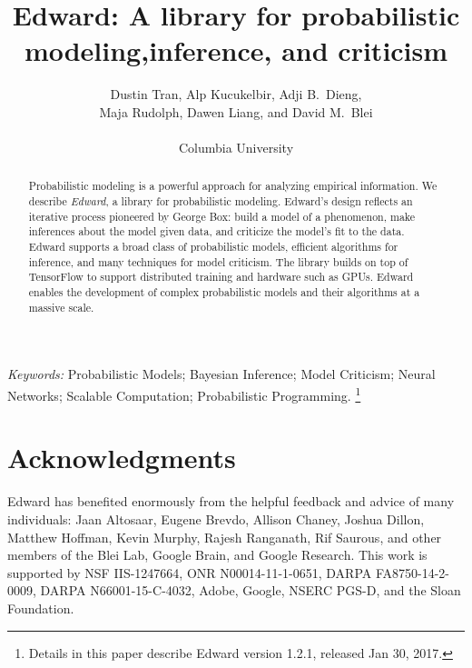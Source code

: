 \documentclass{article}
\title{
Edward: A library for probabilistic modeling,\break inference, and criticism
}
\author{
Dustin Tran, Alp Kucukelbir, Adji B.~Dieng,\\
Maja Rudolph, Dawen Liang, and David M.~Blei\\\\
Columbia University
}
\begin{document}
\hypersetup{pageanchor=false}
\begin{titlepage}
\maketitle
\begin{abstract}
  Probabilistic modeling is a powerful approach for analyzing
  empirical information.
  We describe \emph{Edward}, a library for probabilistic modeling.
  Edward's design reflects an iterative process pioneered by George
  Box: build a model of a phenomenon, make inferences about the model given
  data, and criticize the model's fit to the data. Edward supports a broad class
  of probabilistic models, efficient algorithms for inference, and many
  techniques for model criticism. The library builds on top of
  TensorFlow to support distributed training and hardware such as
  GPUs.
  Edward enables the development of complex probabilistic
  models and their algorithms at a massive scale.
\end{abstract}

\emph{Keywords:}
Probabilistic Models;
Bayesian Inference;
Model Criticism;
Neural Networks;
Scalable Computation;
Probabilistic Programming.%
\footnote{Details in this paper describe Edward version 1.2.1,
released Jan 30, 2017.}

\setcounter{secnumdepth}{2}
\setcounter{tocdepth}{2}
\tableofcontents

\thispagestyle{empty}
\end{titlepage}
\hypersetup{pageanchor=true}

\glsresetall{}

\clearpage



\clearpage

\clearpage













\clearpage


\clearpage
\section{Acknowledgments}
Edward has benefited enormously from the helpful feedback and advice
of many individuals: Jaan Altosaar, Eugene Brevdo, Allison Chaney,
Joshua Dillon, Matthew Hoffman, Kevin Murphy, Rajesh Ranganath, Rif
Saurous, and other members of the Blei Lab, Google Brain, and Google
Research.
This work is supported by NSF IIS-1247664, ONR N00014-11-1-0651,
DARPA FA8750-14-2-0009, DARPA N66001-15-C-4032, Adobe, Google, NSERC
PGS-D, and the Sloan Foundation.

\clearpage


\end{document}
